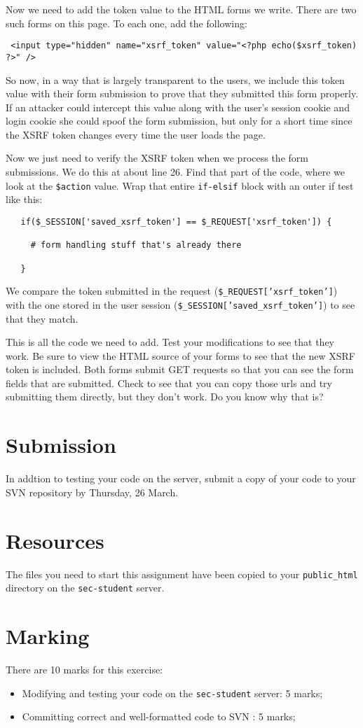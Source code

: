 \documentclass{article}
\begin{document}
Now we need to add the token value to the HTML forms we write.  There are two such forms
on this page.  To each one, add the following:

\begin{verbatim}
 <input type="hidden" name="xsrf_token" value="<?php echo($xsrf_token) ?>" />
\end{verbatim}

So now, in a way that is largely transparent to the users, we include this token value
with their form submission to prove that they submitted this form properly.  If an 
attacker could intercept this value along with the user's session cookie and login cookie
she could spoof the form submission, but only for a short time since the XSRF token changes
every time the user loads the page.

\newpage 

Now we just need to verify the XSRF token when we process the form submissions.  We do this at about 
line 26. Find that part of the code, where we look at the \texttt{\$action} value. Wrap that entire
\texttt{if-elsif} block with an outer if test like this:

\begin{verbatim}
   if($_SESSION['saved_xsrf_token'] == $_REQUEST['xsrf_token']) {

     # form handling stuff that's already there

   }
\end{verbatim}

We compare the token submitted in the request (\texttt{\$\_REQUEST['xsrf\_token']})
with the one stored in the user session  (\texttt{\$\_SESSION['saved\_xsrf\_token']}) to 
see that they match.

This is all the code we need to add.  Test your modifications to see that they work.  Be sure
to view the HTML source of your forms to see that the new XSRF token is included.  Both forms
submit GET requests so that you can see the form fields that are submitted. Check to see that
you can copy those urls and try submitting them directly, but they don't work.  Do you know why 
that is?

\section{Submission}
In addtion to testing your code on the server, submit a copy of your code to your SVN repository by
Thursday, 26 March.

\section{Resources}
The files you need to start this assignment have been copied to your \texttt{public\_html} directory
on the \texttt{sec-student} server.

\section{Marking}

There are 10 marks for this exercise:

\begin{itemize}
	\item Modifying and testing your code on the \texttt{sec-student} server: 5 marks;
	\item Committing correct and well-formatted code to SVN : 5 marks;
\end{itemize}
\end{document}
